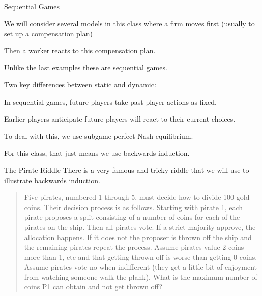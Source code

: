 \documentclass[aspectratio=169,usenames,dvipsnames]{beamer}
\newenvironment{wideitemize}{\itemize\addtolength{\itemsep}{10pt}}{\enditemize}
\begin{document}
\begin{frame}{Sequential Games}
\begin{wideitemize}
    \item We will consider several models in this class where a firm moves first (usually to set up a compensation plan)
    \item Then a worker reacts to this compensation plan.
    \item Unlike the last examples these are sequential games.
    \item Two key differences between static and dynamic:
    \begin{wideitemize}
        \item In sequential games, future players take past player actions as fixed.
        \item Earlier players anticipate future players will react to their current choices.
    \end{wideitemize}
    \item To deal with this, we use subgame perfect Nash equilibrium.
    \item For this class, that just means we use backwards induction.
\end{wideitemize}
    
\end{frame}
\begin{frame}{The Pirate Riddle}
There is a very famous and tricky riddle that we will use to illustrate backwards induction.
\begin{quote}
    Five pirates, numbered 1 through 5, must decide how to divide 100 gold coins. Their decision process is as follows. Starting with pirate 1, each pirate proposes a split consisting of a number of coins for each of the pirates on the ship. Then all pirates vote. If a strict majority approve, the allocation happens. If it does not the proposer is thrown off the ship and the remaining pirates repeat the process. Assume pirates value 2 coins more than 1, etc and that getting thrown off is worse than getting 0 coins. Assume pirates vote no when indifferent (they get a little bit of enjoyment from watching someone walk the plank). What is the maximum number of coins P1 can obtain and not get thrown off?
\end{quote}
    
\end{frame}
\end{document}
